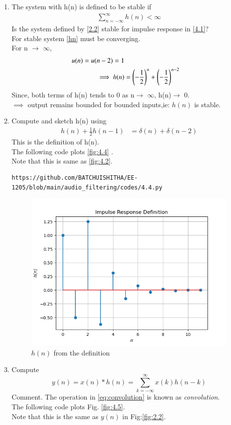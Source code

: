 \documentclass[journal,12pt,twocolumn]{IEEEtran}
\theoremstyle{remark}
\begin{document}
\begin{enumerate}[label=\thesection.\arabic*]
\item The system with h(n) is defined to be stable if
\begin{align}
\sum_{n=-\infty}^{\infty}h(n) < \infty \label{hn}
\end{align}
Is the system defined by \eqref{2.2} stable for impulse response in \eqref{4.1}?\\
\solution For stable system \eqref{hn} must be converging.\\
For n $\rightarrow$ $\infty$,
\begin{align}
u(n)=u(n-2)=1\\
\implies h(n) &= \left(-\frac{1}{2}\right)^{n}+ \left(-\frac{1}{2}\right)^{n-2}
\end{align}
Since, both terms of h(n) tends to 0 as n$\rightarrow$ $\infty$, h(n)$\rightarrow$ $0$.\\
$\implies$ output remains bounded for bounded inputs,ie: $h(n)$ is stable.
\item Compute  and sketch h(n) using 
\begin{align}
h(n) + \frac{1}{2}h(n-1) &= \delta(n)+\delta(n-2)
\end{align}
This is the definition of h(n).\\
\solution The following code plots \eqref{fig:4.4} .\\
Note that this is same as \eqref{fig:4.2}.
\begin{lstlisting}
https://github.com/BATCHUISHITHA/EE-1205/blob/main/audio_filtering/codes/4.4.py
\end{lstlisting}
\begin{figure}[ht]
	\centering
	\includegraphics[width=\columnwidth]{figs/4.4.png}
	\caption{$h(n)$ from the definition}
	\label{fig:4.4}
\end{figure}
\item Compute 
\begin{equation}
\label{eq:convolution}
y(n) = x(n)*h(n) = \sum_{k=-\infty}^{\infty}x(k)h(n-k)
\end{equation}
Comment. The operation in \eqref{eq:convolution} is known as
{\em convolution}.\\
\solution The following code plots Fig. \ref{fig:4.5}. \\
Note that this is the same as $y(n)$ in  Fig:\ref{fig:2.2}. 


\end{enumerate}
\end{document}
